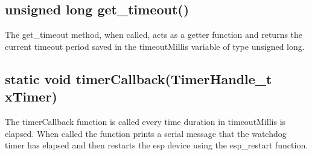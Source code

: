 \subsection{unsigned long get\_timeout()}
\label{subsec:Watchdog_get_timeout}
The get\_timeout method, when called, acts as a getter function and returns the current timeout period saved in the timeoutMillis variable of type unsigned long. 

\subsection{static void timerCallback(TimerHandle\_t xTimer)}
\label{subsec:Watchdog_timerCallback}
The timerCallback function is called every time duration in timeoutMillis is elapsed. 
When called the function prints a serial message that the watchdog timer has elapsed and then restarts the esp device using the esp\_restart function. 
